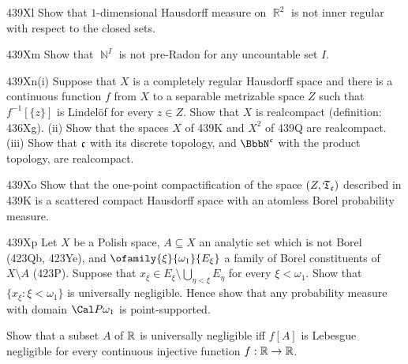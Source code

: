 {\spheader 439Xl Show that $1$-dimensional Hausdorff measure on $\BbbR^2$
is not inner regular with respect to the closed sets.   

\spheader 439Xm Show that $\BbbN^I$ is not pre-Radon for any uncountable
set $I$.   

\spheader 439Xn(i) Suppose that $X$ is a completely regular Hausdorff
space and there is a continuous function $f$ from $X$ to a separable
metrizable space $Z$ such that $f^{-1}[\{z\}]$ is Lindel\"of for every
$z\in Z$.   Show that $X$ is realcompact (definition:  436Xg).   (ii)
Show that the spaces $X$ of 439K and $X^2$ of 439Q are realcompact.
(iii) Show that $\frak c$ with its discrete topology, and
$\BbbN^{\frak c}$ with the product topology, are realcompact.

\spheader 439Xo Show that the one-point compactification of the space
$(Z,\frak T_{\frak c})$ described in 439K is a scattered compact Hausdorff
space with an atomless Borel probability measure.

\spheader 439Xp Let $X$ be a Polish space, $A\subseteq X$
an analytic set which is not
Borel (423Qb, 423Ye), and $\ofamily{\xi}{\omega_1}{E_{\xi}}$ a
family of Borel
constituents of $X\setminus A$ (423P).   Suppose that
$x_{\xi}\in E_{\xi}\setminus\bigcup_{\eta<\xi}E_{\eta}$ for every
$\xi<\omega_1$.   Show that $\{x_{\xi}:\xi<\omega_1\}$ is universally
negligible.   Hence show that any probability measure with domain
$\Cal P\omega_1$ is point-supported.

Show that a subset $A$ of $\Bbb R$ is universally
negligible iff $f[A]$ is Lebesgue negligible for every continuous
injective function $f:\Bbb R\to\Bbb R$.   

}
